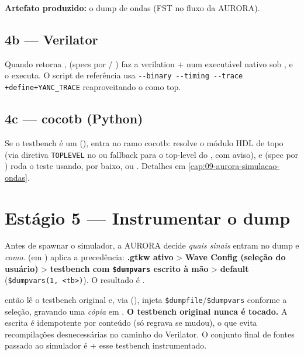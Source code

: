 \textbf{Artefato produzido:} o dump de ondas (FST no fluxo da AURORA).

\subsection{4b — Verilator}

Quando  retorna , 
(specs por  / ) faz a
verilation +  num executável nativo sob , e
 o executa. O script de referência usa
\lstinline|--binary --timing --trace +define+YANC_TRACE| reaproveitando o
 como top.

\subsection{4c — cocotb (Python)}

Se o testbench é um  (),  entra no
ramo cocotb:  resolve o módulo HDL de topo (via
diretiva \lstinline|TOPLEVEL| no  ou fallback para o top-level do
, com aviso), e  (spec por
) roda o teste usando, por baixo,  ou
. Detalhes em \autoref{cap:09-aurora-simulacao-ondas}.

\section{Estágio 5 — Instrumentar o dump}
\label{sec:17-instrumentar}

Antes de spawnar o simulador, a AURORA decide \emph{quais sinais} entram no dump e
\emph{como}.  (em )
aplica a precedência: \textbf{.gtkw ativo} > \textbf{Wave Config (seleção do
usuário)} > \textbf{testbench com \lstinline|$dumpvars| escrito à mão} >
\textbf{default} (\lstinline|$dumpvars(1, <tb>)|). O resultado é
.

 então lê o testbench original e, via
 (), injeta
\lstinline|$dumpfile|/\lstinline|$dumpvars| conforme a seleção, gravando uma
\emph{cópia} em . \textbf{O testbench original
nunca é tocado.} A escrita é idempotente por conteúdo (só regrava se mudou), o que
evita recompilações desnecessárias no caminho do Verilator. O conjunto final de
fontes passado ao simulador é  + esse testbench
instrumentado.

